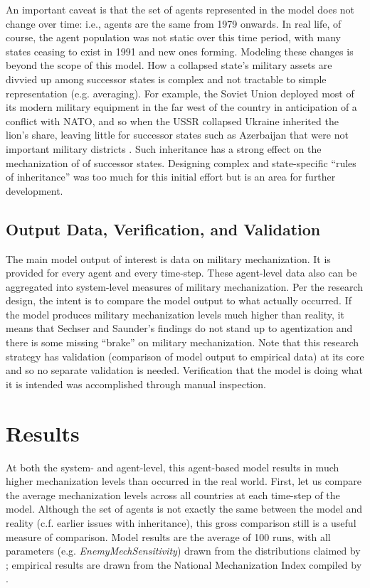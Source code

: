 \documentclass{article}
\begin{document}
An important caveat is that the set of agents represented in the model does not
change over time: i.e., agents are the same from 1979 onwards. In real life,
of course, the agent population was not static over this time period, with many
states ceasing to exist in 1991 and new ones forming. Modeling these changes is
beyond the scope of this model. How a collapsed state's military assets are divvied up
among successor states is complex and not tractable to simple representation
(e.g. averaging). For example, the Soviet Union deployed most of its modern
military equipment in the far west of the country in anticipation of a conflict
with NATO, and so when the USSR collapsed Ukraine inherited the lion's share, leaving
little for successor states such as Azerbaijan that were not important military
districts \citep{roy1993military}. Such inheritance has
a strong effect on the mechanization of of successor states. Designing
complex and state-specific ``rules of inheritance'' was too much for this
initial effort but is an area for further development.

\subsection{Output Data, Verification, and Validation}

The main model output of interest is data on military mechanization. It is provided for
every agent and every time-step. These agent-level data also can be aggregated
into system-level measures of military mechanization. Per the research design,
the intent is to compare the model output to what actually occurred. If the
model produces military mechanization levels much higher than reality, it means
that Sechser and Saunder's findings do not stand up to agentization and there is
some missing ``brake'' on military mechanization. Note that this research
strategy has validation (comparison of model output to empirical data) at its
core and so no separate validation is needed. Verification that the model is
doing what it is intended was accomplished through manual inspection.

\section{Results}

At both the system- and agent-level, this agent-based model results in much
higher mechanization levels than occurred in the real world. First, let us
compare the average mechanization levels across all countries at each time-step
of the model. Although the set of agents is not exactly the same between the
model and reality (c.f. earlier issues with inheritance), this
gross comparison still is a useful measure of comparison. Model results are
the average of 100 runs, with all parameters (e.g.
\textit{EnemyMechSensitivity}) drawn from the distributions claimed by
\citet{sechser2010army}; empirical results are drawn from the National
Mechanization Index compiled by \citet{sechser2010army}.
\end{document}
